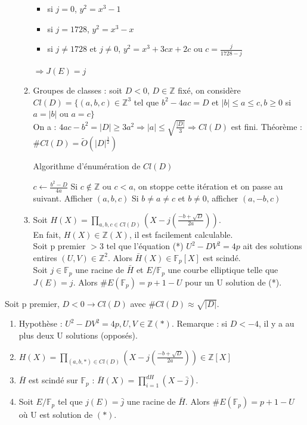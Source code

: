 \documentclass[12pt,a4paper]{report}
\begin{document}
\begin{enumerate}
\begin{enumerate}
\begin{itemize}
\item si $j=0$, $ y^2=x^3-1$
\item si $j=1728$, $y^2=x^3-x$
\item si $j\neq 1728$ et $j\neq 0$, $y^2=x^3+3cx +2c $ ou $c=\frac{j}{1728-j}$
\end{itemize}
$\Longrightarrow J(E)=j$
\item Groupes de classes : soit $D<0$, $D\in \mathbb{Z}$ fixé, on considère \\
$Cl(D)=\{(a,b,c)\in \mathbb{Z}^3$ tel que $ b^2-4ac = D $ et $ |b|\leqslant a \leqslant c, b\geqslant 0 $ si $ a=|b| $ ou $ a=c\}$\\
On a : $ 4ac-b^2 = |D| \geqslant 3a^2 \Rightarrow |a| \leqslant \sqrt{\frac{|D|}{3}} \Rightarrow Cl(D)$ est fini.
Théorème : $\# Cl(D) = \tilde{O}(|D|^{\frac{1}{2}})$\\
\begin{algorithm}[h]
\caption{Algorithme d'énumération de $Cl(D)$}
\begin{algorithmic}[1]
\STATE $c\longleftarrow \frac{b^2-D}{4a}$
\STATE Si $ c \not \in \mathbb{Z}$ ou $ c<a$, on stoppe cette itération et on passe au suivant.
\STATE Afficher $(a,b,c)$
\STATE Si $ b\neq a \neq c$ et $ b\neq 0$, afficher $(a,-b,c)$
\ENDFOR
\ENDFOR
\end{algorithmic}
\end{algorithm}
\item Soit $\displaystyle H(X) = \prod_{a,b,c \in Cl(D)}\left(X-j\left(\frac{-b+\sqrt{D}}{2a}\right)\right) $.\\ En fait, $H(X) \in \mathbb{Z}(X)$, il est facilement calculable.\\
Soit p premier $>3$ tel que l'équation (*) $ U^2-DV^2 = 4p$ ait des solutions entires $(U,V) \in \mathbb{Z}^2$. Alors $\bar{H}(X) \in \mathbb{F}_p[X]$ est scindé.\\
Soit $ j \in \mathbb{F}_p$ une racine de $\bar{H}$ et $E / \mathbb{F}_p $ une courbe elliptique telle que $ J(E)=j$. Alors $ \# E(\mathbb{F}_p)= p+1-U$ pour un U solution de (*).
\end{enumerate}
\end{enumerate}
Soit p premier, $D < 0 \rightarrow Cl(D)$ avec $\# Cl(D) \approx \sqrt{|D|}$.
\begin{enumerate}
\item Hypothèse : $ U^2-DV^2 = 4p, U,V \in \mathbb{Z} (*)$. Remarque : si $D < -4$, il y a au plus deux U solutions (opposés).
\item $ \displaystyle H(X) = \prod_{(a,b,*)\in Cl(D)} \left(X-j\left(\frac{-b + \sqrt{D}}{2a}\right)\right) \in \mathbb{Z}[X]$
\item $\bar{H}$ est scindé sur $ \mathbb{F}_p$ : $\displaystyle \bar{H}(X)=\prod_{i=1}^{dH}(X-\bar{j})$.
\item Soit $E/\mathbb{F}_p$ tel que $j(E) = \bar{j}$ une racine de $\bar{H}$. Alors $\# E(\mathbb{F}_p)=p+1-U$ où U est solution de $(*)$.
\end{enumerate}
\end{document}
